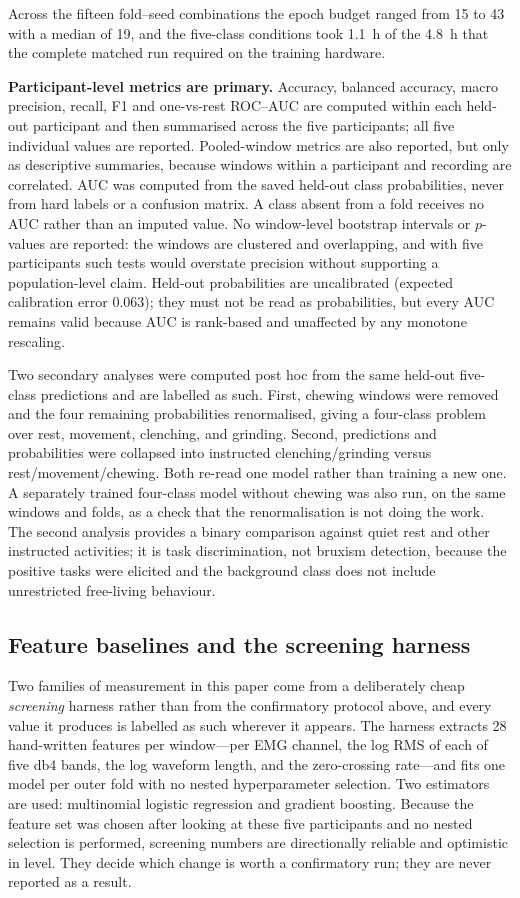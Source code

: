 \documentclass[pdflatex,sn-nature,iicol]{sn-jnl}
\begin{document}
Across the fifteen fold--seed combinations the epoch budget ranged from 15 to 43 with a median of 19, and the five-class conditions took 1.1~h of the 4.8~h that the complete matched run required on the training hardware.

\textbf{Participant-level metrics are primary.} Accuracy, balanced accuracy, macro precision, recall, F1 and one-vs-rest ROC--AUC are computed within each held-out participant and then summarised across the five participants; all five individual values are reported. Pooled-window metrics are also reported, but only as descriptive summaries, because windows within a participant and recording are correlated. AUC was computed from the saved held-out class probabilities, never from hard labels or a confusion matrix. A class absent from a fold receives no AUC rather than an imputed value. No window-level bootstrap intervals or $p$-values are reported: the windows are clustered and overlapping, and with five participants such tests would overstate precision without supporting a population-level claim. Held-out probabilities are uncalibrated (expected calibration error 0.063); they must not be read as probabilities, but every AUC remains valid because AUC is rank-based and unaffected by any monotone rescaling.

Two secondary analyses were computed post hoc from the same held-out five-class predictions and are labelled as such. First, chewing windows were removed and the four remaining probabilities renormalised, giving a four-class problem over rest, movement, clenching, and grinding. Second, predictions and probabilities were collapsed into instructed clenching/grinding versus rest/movement/chewing. Both re-read one model rather than training a new one. A separately trained four-class model without chewing was also run, on the same windows and folds, as a check that the renormalisation is not doing the work. The second analysis provides a binary comparison against quiet rest and other instructed activities; it is task discrimination, not bruxism detection, because the positive tasks were elicited and the background class does not include unrestricted free-living behaviour.

\subsection{Feature baselines and the screening harness}
\label{sec:screening}

Two families of measurement in this paper come from a deliberately cheap \emph{screening} harness rather than from the confirmatory protocol above, and every value it produces is labelled as such wherever it appears. The harness extracts 28 hand-written features per window---per EMG channel, the log RMS of each of five db4 bands, the log waveform length, and the zero-crossing rate---and fits one model per outer fold with no nested hyperparameter selection. Two estimators are used: multinomial logistic regression and gradient boosting. Because the feature set was chosen after looking at these five participants and no nested selection is performed, screening numbers are directionally reliable and optimistic in level. They decide which change is worth a confirmatory run; they are never reported as a result.
\end{document}
